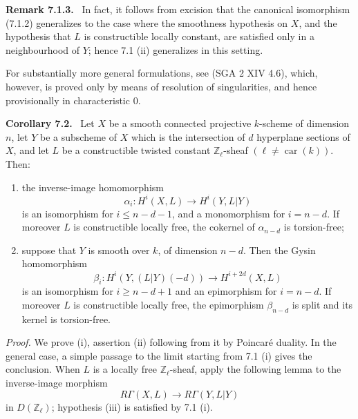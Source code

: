 \documentclass[11pt]{article}
\newenvironment{statement}[1]{\par\medskip\noindent\textbf{#1.}\ }{\par\medskip}
\begin{document}
\begin{statement}{Remark 7.1.3}
In fact, it follows from excision that the canonical isomorphism (7.1.2) generalizes to the case where the smoothness hypothesis on $X$, and the hypothesis that $L$ is constructible locally constant, are satisfied only in a neighbourhood of $Y$; hence 7.1 (ii) generalizes in this setting.

For substantially more general formulations, see (SGA 2 XIV 4.6), which, however, is proved only by means of resolution of singularities, and hence provisionally in characteristic $0$.
\end{statement}

\begin{statement}{Corollary 7.2}
Let $X$ be a smooth connected projective $k$-scheme of dimension $n$, let $Y$ be a subscheme of $X$ which is the intersection of $d$ hyperplane sections of $X$, and let $L$ be a constructible twisted constant $\mathbb Z_\ell$-sheaf $(\ell\ne\operatorname{car}(k))$. Then:
\begin{enumerate}[label=(\roman*)]
\item the inverse-image homomorphism
\[
\alpha_i:H^i(X,L)\to H^i(Y,L|Y)
\]
is an isomorphism for $i\le n-d-1$, and a monomorphism for $i=n-d$. If moreover $L$ is constructible locally free, the cokernel of $\alpha_{n-d}$ is torsion-free;
\item suppose that $Y$ is smooth over $k$, of dimension $n-d$. Then the Gysin homomorphism
\[
\beta_i:H^i(Y,(L|Y)(-d))\to H^{i+2d}(X,L)
\]
is an isomorphism for $i\ge n-d+1$ and an epimorphism for $i=n-d$. If moreover $L$ is constructible locally free, the epimorphism $\beta_{n-d}$ is split and its kernel is torsion-free.
\end{enumerate}
\end{statement}

\emph{Proof.} We prove (i), assertion (ii) following from it by Poincaré duality. In the general case, a simple passage to the limit starting from 7.1 (i) gives the conclusion. When $L$ is a locally free $\mathbb Z_\ell$-sheaf, apply the following lemma to the inverse-image morphism
\[
R\Gamma(X,L)\to R\Gamma(Y,L|Y)
\]
in $D(\mathbb Z_\ell)$; hypothesis (iii) is satisfied by 7.1 (i).
\end{document}
